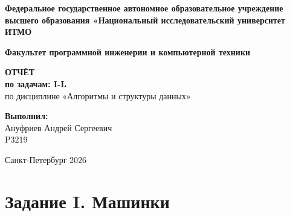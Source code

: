 \documentclass[a4paper,12pt]{article}
\begin{document}
    \begin{titlepage}
        \begin{center}
            \textbf{Федеральное государственное автономное образовательное учреждение высшего образования «Национальный исследовательский университет ИТМО} \\
            \vspace{1cm}

            \textbf{Факультет программной инженерии и компьютерной техники} \\
            \vspace{1cm}

            \Large{\textbf{ОТЧЁТ}} \\
            \Large{\textbf{по задачам: I-L}} \\
            \large{по дисциплине «Алгоритмы и структуры данных»} \\
            \vspace{2cm}
        \end{center}

        \begin{flushright}
            \textbf{Выполнил:} \\
            Ануфриев Андрей Сергеевич \\
            P3219 \\
        \end{flushright}

        \vfill
        \begin{center}
            Санкт-Петербург 2026
        \end{center}
    \end{titlepage}

    \tableofcontents
    \newpage



    \section{Задание I. Машинки}

    
\end{document}
